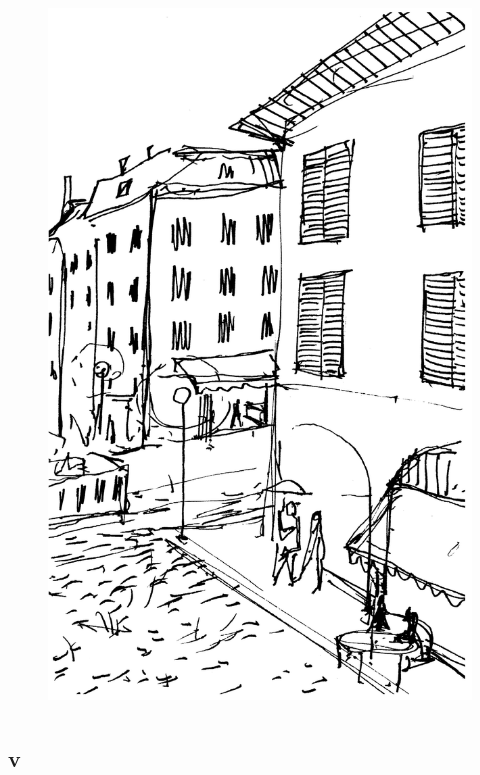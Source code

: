 \begin{figure}
\includegraphics[width=\textwidth]{./imgs/rua1.png}
\end{figure}



\chapter*{}
\section{v}

